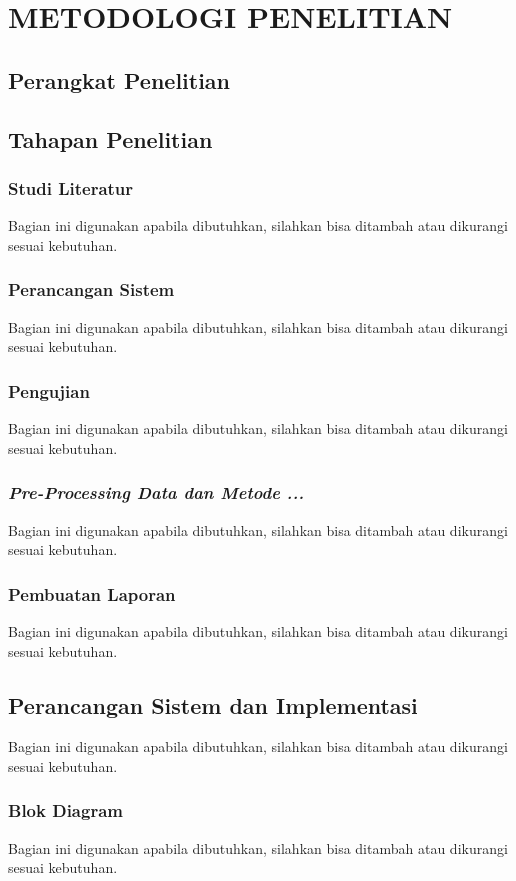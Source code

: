 \chapter[METODOLOGI PENELITIAN]{\\ METODOLOGI PENELITIAN}

\section{Perangkat Penelitian}
\section{Tahapan Penelitian}
\subsection{Studi Literatur}
Bagian ini digunakan apabila dibutuhkan, silahkan bisa ditambah atau dikurangi sesuai kebutuhan.
\subsection{Perancangan Sistem}
Bagian ini digunakan apabila dibutuhkan, silahkan bisa ditambah atau dikurangi sesuai kebutuhan.
\subsection{Pengujian}
Bagian ini digunakan apabila dibutuhkan, silahkan bisa ditambah atau dikurangi sesuai kebutuhan.
\subsection{\textit{Pre-Processing Data dan Metode ...}}
Bagian ini digunakan apabila dibutuhkan, silahkan bisa ditambah atau dikurangi sesuai kebutuhan.
\subsection{Pembuatan Laporan}
Bagian ini digunakan apabila dibutuhkan, silahkan bisa ditambah atau dikurangi sesuai kebutuhan.
\section{Perancangan Sistem dan Implementasi}
Bagian ini digunakan apabila dibutuhkan, silahkan bisa ditambah atau dikurangi sesuai kebutuhan.
\subsection{Blok Diagram}
Bagian ini digunakan apabila dibutuhkan, silahkan bisa ditambah atau dikurangi sesuai kebutuhan.
